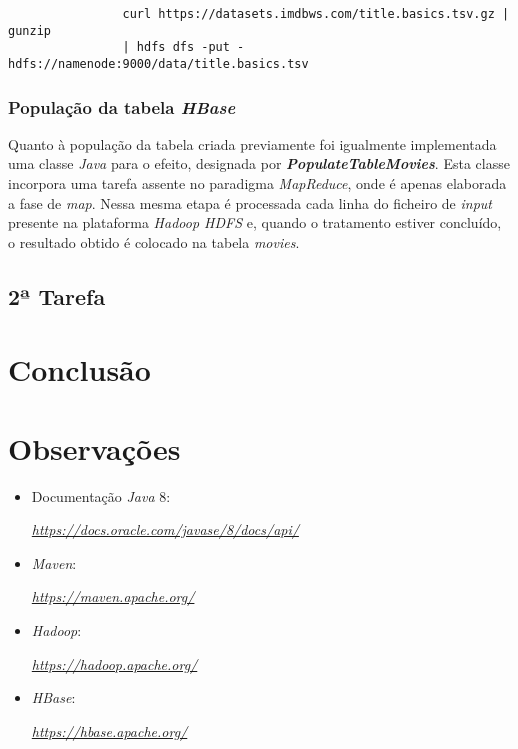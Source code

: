 \documentclass[a4paper]{report}
\begin{document}
{{\begin{verbatim}
			    curl https://datasets.imdbws.com/title.basics.tsv.gz | gunzip 
			    | hdfs dfs -put - hdfs://namenode:9000/data/title.basics.tsv
			\end{verbatim}
		}

		\subsection{População da tabela \textit{HBase}} \label{job1-3}
		Quanto à população da tabela criada previamente foi igualmente implementada uma classe \textit{Java} para o efeito, designada por \textbf{\textit{PopulateTableMovies}}.
		Esta classe incorpora uma tarefa assente no paradigma \textit{MapReduce}, onde é apenas elaborada a fase de \textit{map}.
		Nessa mesma etapa é processada cada linha do ficheiro de \textit{input} presente na plataforma \textit{Hadoop HDFS} e, quando o tratamento estiver concluído, o resultado obtido é colocado na tabela \textit{movies}.

	\section{2ª Tarefa} \label{job2}
		\subsection{}
		\subsubsection{}
}

\chapter{Conclusão}
\large{
	
}

\appendix
\chapter{Observações}
\begin{itemize}
    \item Documentação \textit{Java} 8:
    \par \textit{\url{https://docs.oracle.com/javase/8/docs/api/}}
	\item \textit{Maven}:
    \par \textit{\url{https://maven.apache.org/}}
    \item \textit{Hadoop}:
    \par \textit{\url{https://hadoop.apache.org/}}
    \item \textit{HBase}:
    \par \textit{\url{https://hbase.apache.org/}}
\end{itemize}
\end{document}
